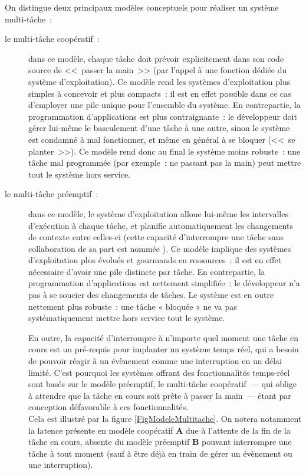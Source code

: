 On distingue deux principaux modèles conceptuels pour réaliser un système
multi-tâche~:

\begin{description}

\item[le multi-tâche coopératif~:] dans ce modèle, chaque tâche doit prévoir
explicitement dans son  code source de <<~passer la main~>> (par l'appel à
une fonction dédiée du système d'exploitation).
Ce modèle rend les systèmes d'exploitation plus simples à concevoir et
plus compacts~: il est en effet possible dans ce cas d'employer une pile
unique pour l'ensemble du système.
En contrepartie, la programmation d'applications est plus contraignante~:
le développeur doit gérer lui-même le basculement d'une tâche à une autre,
sinon le système est condamné à mal fonctionner, et même en général à se
bloquer (<<~se planter~>>). Ce modèle rend donc au final le système moins
robuste~: une tâche mal programmée (par exemple~: ne passant pas la main)
peut mettre tout le système hors service.

\item[le multi-tâche préemptif~:] dans ce modèle, le système d'exploitation
alloue lui-même les intervalles d'exécution à chaque tâche, et planifie
automatiquement les changements de contexte entre celles-ci (cette capacité
d'interrompre une tâche sans collaboration de sa part est nommée
). Ce modèle implique des systèmes d'exploitation plus
évolués et gourmands en ressources~: il est en effet nécessaire d'avoir une
pile distincte par tâche. En contrepartie, la programmation d'applications
est nettement simplifiée~: le développeur n'a pas à se soucier des
changements de tâches. Le système est en outre nettement plus robuste~:
une tâche « bloquée » ne va pas systématiquement mettre hors service
tout le système.

En outre, la capacité d'interrompre à n'importe quel moment une tâche
en cours est un pré-requis pour implanter un système temps réel, qui
a besoin de pouvoir réagir à un évènement comme une interruption en un délai
limité. C'est pourquoi les systèmes offrant des fonctionnalités temps-réel
sont basés sur le modèle préemptif, le multi-tâche coopératif~---
qui oblige à attendre que la tâche en cours soit prête à passer la main~---
étant par conception défavorable à ces fonctionnalités.\\
Cela est illustré par la figure \vref{FigModeleMultitache}.
On notera notamment la latence présente en modèle coopératif \textbf{A}
due à l'attente de la fin de la tâche en cours, absente du modèle préemptif
\textbf{B} pouvant interrompre une tâche à tout moment (sauf à être
déjà en train de gérer un évènement ou une interruption).

\end{description}

